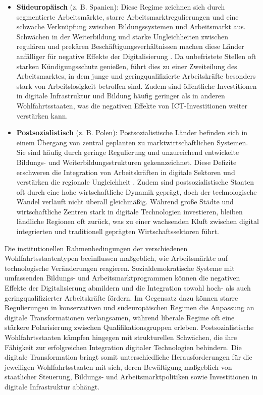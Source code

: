 \begin{itemize}
    \item \textbf{Südeuropäisch} (z. B. Spanien): Diese Regime zeichnen sich durch 
    segmentierte Arbeitsmärkte, starre Arbeitsmarktregulierungen und eine schwache 
    Verknüpfung zwischen Bildungssystemen und Arbeitsmarkt aus. Schwächen in der Weiterbildung 
    und starke Ungleichheiten zwischen regulären und prekären Beschäftigungsverhältnissen 
    machen diese Länder anfälliger für negative Effekte der Digitalisierung 
    \parencite{ferrera1996thesouthern}. Da unbefristete Stellen oft starken Kündigungsschutz 
    genießen, führt dies zu einer Zweiteilung des Arbeitsmarktes, in dem junge und geringqualifizierte 
    Arbeitskräfte besonders stark von Arbeitslosigkeit betroffen sind. Zudem sind öffentliche 
    Investitionen in digitale Infrastruktur und Bildung häufig geringer als in anderen Wohlfahrtsstaaten, 
    was die negativen Effekte von \ac{ICT}-Investitionen weiter verstärken kann.

    \item \textbf{Postsozialistisch} (z. B. Polen): Postsozialistische Länder befinden sich 
    in einem Übergang von zentral geplanten zu marktwirtschaftlichen Systemen. Sie sind 
    häufig durch geringe Regulierung und unzureichend entwickelte Bildungs- und 
    Weiterbildungsstrukturen gekennzeichnet. Diese Defizite erschweren die Integration von 
    Arbeitskräften in digitale Sektoren und verstärken die regionale Ungleichheit 
    \parencite{cerami2006socialpolicy}. Zudem sind postsozialistische Staaten oft durch eine 
    hohe wirtschaftliche Dynamik geprägt, doch der technologische Wandel verläuft nicht überall 
    gleichmäßig. Während große Städte und wirtschaftliche Zentren stark in digitale Technologien 
    investieren, bleiben ländliche Regionen oft zurück, was zu einer wachsenden Kluft zwischen 
    digital integrierten und traditionell geprägten Wirtschaftssektoren führt.
\end{itemize}

Die institutionellen Rahmenbedingungen der verschiedenen Wohlfahrtsstaatentypen beeinflussen 
maßgeblich, wie Arbeitsmärkte auf technologische Veränderungen reagieren. Sozialdemokratische 
Systeme mit umfassenden Bildungs- und Arbeitsmarktprogrammen können die negativen Effekte der 
Digitalisierung abmildern und die Integration sowohl hoch- als auch geringqualifizierter 
Arbeitskräfte fördern. Im Gegensatz dazu können starre Regulierungen in konservativen und 
südeuropäischen Regimen die Anpassung an digitale Transformationen verlangsamen, während 
liberale Regime oft eine stärkere Polarisierung zwischen Qualifikationsgruppen erleben. 
Postsozialistische Wohlfahrtsstaaten kämpfen hingegen mit strukturellen Schwächen, die ihre 
Fähigkeit zur erfolgreichen Integration digitaler Technologien behindern. Die digitale 
Transformation bringt somit unterschiedliche Herausforderungen für die jeweiligen Wohlfahrtsstaaten 
mit sich, deren Bewältigung maßgeblich von staatlicher Steuerung, Bildungs- und 
Arbeitsmarktpolitiken sowie Investitionen in digitale Infrastruktur abhängt.

